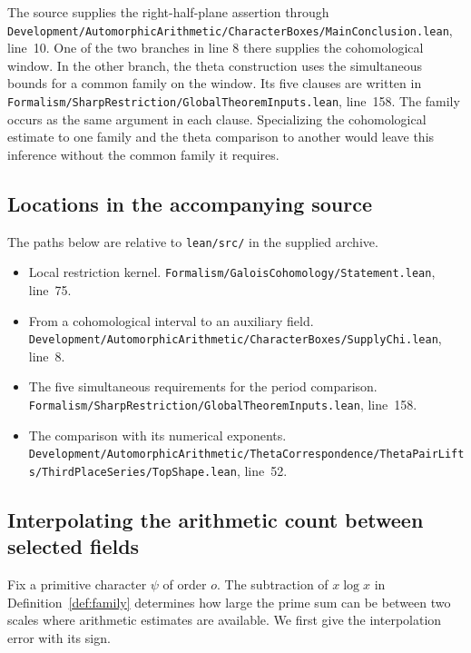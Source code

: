\documentclass[a4paper,11pt]{article}
\theoremstyle{definition}
\theoremstyle{remark}
\newcommand{\srcloc}[2]{{\small\nolinkurl{#1.lean}}, line~#2}
\numberwithin{equation}{section}
\begin{document}
The source supplies the right-half-plane assertion through
\srcloc{Development/AutomorphicArithmetic/CharacterBoxes/MainConclusion}{10}.
One of the two branches in line 8 there supplies the
cohomological window. In the other branch, the theta
construction uses the simultaneous bounds for a common
family on the window. Its five clauses are written in
\srcloc{Formalism/SharpRestriction/GlobalTheoremInputs}{158}.
The family occurs as the same argument in each clause.
Specializing the cohomological estimate to one family and
the theta comparison to another would leave this inference
without the common family it requires.

\subsection{Locations in the accompanying source}\label{nav:I-35}
The paths below are relative to \nolinkurl{lean/src/} in the supplied archive.
\begin{itemize}\setlength{\itemsep}{1pt}
\item Local restriction kernel. \srcloc{Formalism/GaloisCohomology/Statement}{75}.
\item From a cohomological interval to an auxiliary field. \srcloc{Development/AutomorphicArithmetic/CharacterBoxes/SupplyChi}{8}.
\item The five simultaneous requirements for the period comparison. \srcloc{Formalism/SharpRestriction/GlobalTheoremInputs}{158}.
\item The comparison with its numerical exponents. \srcloc{Development/AutomorphicArithmetic/ThetaCorrespondence/ThetaPairLifts/ThirdPlaceSeries/TopShape}{52}.
\end{itemize}
\clearpage


\subsection{Interpolating the arithmetic count between selected fields}
\label{nav:count-interpolation-666}

Fix a primitive character \(\psi\) of order \(o\). The subtraction of
\(x\log x\) in Definition~\ref{def:family} determines how large the
prime sum can be between two scales where arithmetic estimates are
available. We first give the interpolation error with its sign.
\end{document}
